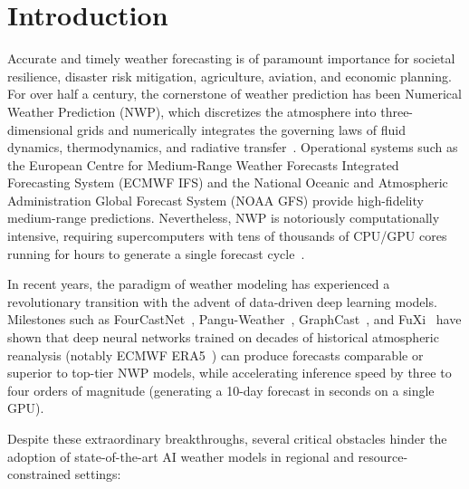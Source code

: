 \section{Introduction}
\label{sec:intro}

Accurate and timely weather forecasting is of paramount importance for societal resilience, disaster risk mitigation, agriculture, aviation, and economic planning. For over half a century, the cornerstone of weather prediction has been Numerical Weather Prediction (NWP), which discretizes the atmosphere into three-dimensional grids and numerically integrates the governing laws of fluid dynamics, thermodynamics, and radiative transfer~\cite{bauer2015quiet}. Operational systems such as the European Centre for Medium-Range Weather Forecasts Integrated Forecasting System (ECMWF IFS) and the National Oceanic and Atmospheric Administration Global Forecast System (NOAA GFS) provide high-fidelity medium-range predictions. Nevertheless, NWP is notoriously computationally intensive, requiring supercomputers with tens of thousands of CPU/GPU cores running for hours to generate a single forecast cycle~\cite{brenowitz2018prognostic}.

In recent years, the paradigm of weather modeling has experienced a revolutionary transition with the advent of data-driven deep learning models. Milestones such as FourCastNet~\cite{pathak2022fourcastnet}, Pangu-Weather~\cite{bi2023accurate}, GraphCast~\cite{lam2023learning}, and FuXi~\cite{chen2023fuxi} have shown that deep neural networks trained on decades of historical atmospheric reanalysis (notably ECMWF ERA5~\cite{hersbach2020era5}) can produce forecasts comparable or superior to top-tier NWP models, while accelerating inference speed by three to four orders of magnitude (generating a 10-day forecast in seconds on a single GPU).

Despite these extraordinary breakthroughs, several critical obstacles hinder the adoption of state-of-the-art AI weather models in regional and resource-constrained settings:


